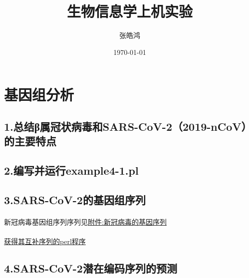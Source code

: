 \documentclass[supercite]{HustGraduPaper}
\title{生物信息学上机实验} %
\author{张皓鸿} %
\date{\today} %
\begin{document}
	\maketitle[logo color=black]

	\clearpage %
	\tableofcontents
	\clearpage%

	\section{基因组分析}
	\subsection{1.总结β属冠状病毒和SARS-CoV-2（2019-nCoV）的主要特点}


  \subsection{2.编写并运行example4-1.pl}

	\subsection{3.SARS-CoV-2的基因组序列}
	\paragraph{}\label{subpara:subpara}新冠病毒基因组序列序列见\href{./material/practice1/gene.txt}{附件:新冠病毒的基因序列}
	\paragraph{}\label{subpara:subpara}\href{./material/practice1/gene_match.pl}{获得其互补序列的perl程序}

  \subsection{4.SARS-CoV-2潜在编码序列的预测}
\end{document}

